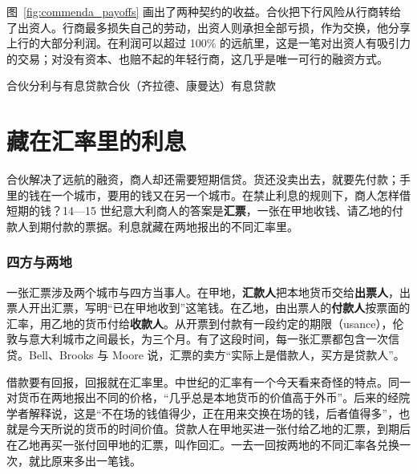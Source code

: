 图~\ref{fig:commenda_payoffs} 画出了两种契约的收益。合伙把下行风险从行商转给了出资人。行商最多损失自己的劳动，出资人则承担全部亏损，作为交换，他分享上行的大部分利润。在利润可以超过 100\% 的远航里，这是一笔对出资人有吸引力的交易；对没有资本、也赔不起的年轻行商，这几乎是唯一可行的融资方式。


\begin{compare}{合伙分利与有息贷款}{合伙（齐拉德、康曼达）}{有息贷款}
\end{compare}

\section{藏在汇率里的利息}\label{sec:islamic-bills}

合伙解决了远航的融资，商人却还需要短期信贷。货还没卖出去，就要先付款；手里的钱在一个城市，要用的钱又在另一个城市。在禁止利息的规则下，商人怎样借短期的钱？14—15 世纪意大利商人的答案是\textbf{汇票}，一张在甲地收钱、请乙地的付款人到期付款的票据。利息就藏在两地报出的不同汇率里。

\subsubsection{四方与两地}
一张汇票涉及两个城市与四方当事人。在甲地，\textbf{汇款人}把本地货币交给\textbf{出票人}，出票人开出汇票，写明“已在甲地收到”这笔钱\cite{bell2017}。在乙地，由出票人的\textbf{付款人}按票面的汇率，用乙地的货币付给\textbf{收款人}。从开票到付款有一段约定的期限（usance），伦敦与意大利城市之间最长，为三个月\cite{bell2017}。有了这段时间，每一张汇票都包含一次信贷。Bell、Brooks 与 Moore 说，汇票的卖方“实际上是借款人，买方是贷款人”\cite{bell2017}。

借款要有回报，回报就在汇率里。中世纪的汇率有一个今天看来奇怪的特点。同一对货币在两地报出不同的价格，“几乎总是本地货币的价值高于外币”\cite{bell2017}。后来的经院学者解释说，这是“不在场的钱值得少，正在用来交换在场的钱，后者值得多”\cite{bell2017}，也就是今天所说的货币的时间价值。贷款人在甲地买进一张付给乙地的汇票，到期后在乙地再买一张付回甲地的汇票，叫作回汇。一去一回按两地的不同汇率各兑换一次，就比原来多出一笔钱。

